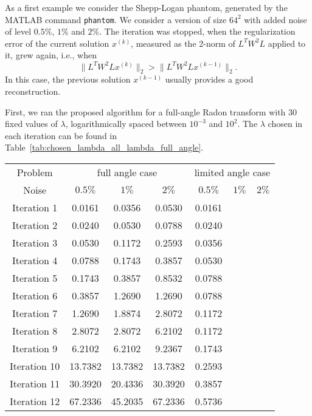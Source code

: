 As a first example we consider the Shepp-Logan phantom, generated by
the MATLAB command \texttt{phantom}. We consider a version of size
$64^2$ with added noise of level $0.5\%$, $1\%$ and $2\%$. The
iteration was stopped, when the regularization error of the current
solution $x^{(k)}$, measured as the 2-norm of $L^TW^2L$ applied to it,
grew again, i.e., when
\[
  \| L^TW^2L x^{(k)} \|_2 > \| L^TW^2L x^{(k-1)} \|_2.
\]
In this case, the previous solution $x^{(k-1)}$ usually provides a
good reconstruction.

First, we ran the proposed algorithm for a full-angle Radon transform
with 30 fixed values of $\lambda$, logarithmically spaced between
$10^{-3}$ and $10^2$. The $\lambda$ chosen in each iteration can be
found in Table~\ref{tab:chosen_lambda_all_lambda_full_angle}.

\begin{table}
  \begin{center}
    \begin{tabular}{c|ccc|ccc}
      Problem & \multicolumn{3}{|c}{full angle case} &
                                                       \multicolumn{3}{|c}{limited
                                                       angle case} \\
      Noise & $0.5\%$ & $1\%$ & $2\%$ & $0.5\%$ & $1\%$ & $2\%$ \\
      \hline
      Iteration 1 & 0.0161 & 0.0356 & 0.0530 & 0.0161 &  &  \\
      Iteration 2 & 0.0240 & 0.0530 & 0.0788 & 0.0240 &  &  \\
      Iteration 3 & 0.0530 & 0.1172 & 0.2593 & 0.0356 &  &  \\
      Iteration 4 & 0.0788 & 0.1743 & 0.3857 & 0.0530 &  &  \\
      Iteration 5 & 0.1743 & 0.3857 & 0.8532 & 0.0788 &  &  \\
      Iteration 6 & 0.3857 & 1.2690 & 1.2690 & 0.0788 &  &  \\
      Iteration 7 & 1.2690 & 1.8874 & 2.8072 & 0.1172 &  &  \\
      Iteration 8 & 2.8072 & 2.8072 & 6.2102 & 0.1172 &  &  \\
      Iteration 9 & 6.2102 & 6.2102 & 9.2367 & 0.1743 &  &  \\
      Iteration 10 & 13.7382 & 13.7382 & 13.7382 & 0.2593 &  &  \\
      Iteration 11 & 30.3920 & 20.4336 & 30.3920 & 0.3857 &  &  \\
      Iteration 12 & 67.2336 & 45.2035 & 67.2336 & 0.5736 &  &  \\

\end{tabular}
\end{center}
\end{table}
